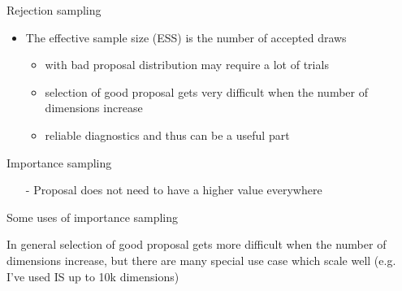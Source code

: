\documentclass[english,t]{beamer}
\DeclareMathOperator{\E}{E}
\begin{document}
\begin{frame}{Rejection sampling}

  \begin{itemize}
  \item The effective sample size (ESS) is the number of accepted draws
    \begin{itemize}
    \item with bad proposal distribution may require a lot of trials
    \item selection of good proposal gets very difficult when
      the number of dimensions increase
    \item reliable diagnostics and thus can be a useful part
    \end{itemize}
  \end{itemize}

\end{frame}


\begin{frame}{Importance sampling}

  \begin{itemize}
     \vspace{-.5\baselineskip}
   \item[-] Proposal does not need to have a higher value everywhere
   \end{itemize}
   \begin{center}
     \vspace{-1\baselineskip}
     \vspace{-1\baselineskip}
     \only<2->{
   \begin{eqnarray*}
      \E[h(\theta)] \approx \frac{\sum_s w_s h(\theta^{(s)})}{\sum_s
      w_s}, \qquad \text{where} \quad 
      w_s =  \frac{q(\theta^{(s)})}{g(\theta^{(s)})} \qquad
   \end{eqnarray*}
   }
   \end{center}

\end{frame}

\begin{frame}{Some uses of importance sampling}

  In general selection of good proposal gets more difficult when the
  number of dimensions increase, but there are many special use case
  which scale well (e.g. I've used IS up to 10k dimensions)


\end{frame}
\end{document}
